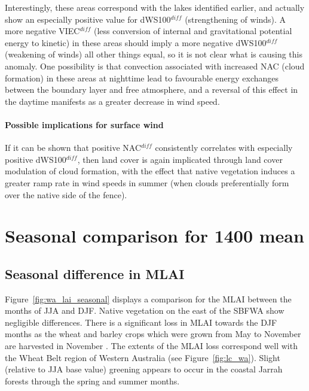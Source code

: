 Interestingly, these areas correspond with the lakes identified earlier, and actually show an especially positive value for \acs{dWS100}$^{diff}$ (strengthening of winds). A more negative \ac{VIEC}$^{diff}$ (less conversion of internal and gravitational potential energy to kinetic) in these areas should imply a more negative \acs{dWS100}$^{diff}$ (weakening of winds) all other things equal, so it is not clear what is causing this anomaly. One possibility is that convection associated with increased \ac{NAC} (cloud formation) in these areas at nighttime lead to favourable energy exchanges between the boundary layer and free atmosphere, and a reversal of this effect in the daytime manifests as a greater decrease in wind speed.

\paragraph{Possible implications for surface wind}

If it can be shown that positive \ac{NAC}$^{diff}$ consistently correlates with especially positive \ac{dWS100}$^{diff}$, then land cover is again implicated through land cover modulation of cloud formation, with the effect that native vegetation induces a greater ramp rate in wind speeds in summer (when clouds preferentially form over the native side of the fence).

\section{Seasonal comparison for 1400 mean}
\label{sec:comp_seasonal_1400}

\subsection{Seasonal difference in MLAI}

Figure~\ref{fig:wa_lai_seasonal} displays a comparison for the \acl{MLAI} between the months of \ac{JJA} and \ac{DJF}. Native vegetation on the east of the \ac{SBFWA} show negligible differences. There is a significant loss in \ac{MLAI} towards the \ac{DJF} months as the wheat and barley crops which were grown from May to November are harvested in November \citep{lyons1996}. The extents of the \ac{MLAI} loss correspond well with the Wheat Belt region of Western Australia (see Figure~\ref{fig:lc_wa}). Slight (relative to \ac{JJA} base value) greening appears to occur in the coastal Jarrah forests through the spring and summer months.

